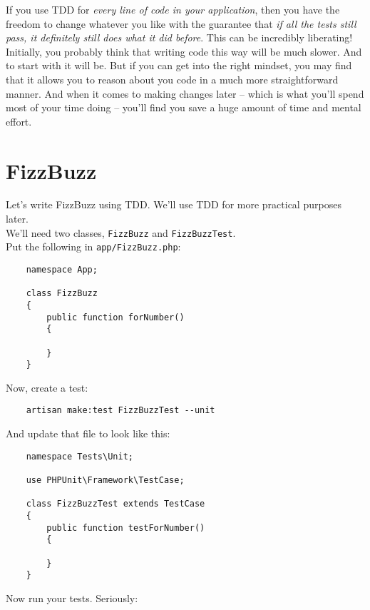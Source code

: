 If you use TDD for \textit{every line of code in your application}, then you have the freedom to change whatever you like with the guarantee that \textit{if all the tests still pass, it definitely still does what it did before}. This can be incredibly liberating!
\\

Initially, you probably think that writing code this way will be much slower. And to start with it will be. But if you can get into the right mindset, you may find that it allows you to reason about you code in a much more straightforward manner. And when it comes to making changes later – which is what you'll spend most of your time doing – you'll find you save a huge amount of time and mental effort.

\section{FizzBuzz}

Let's write FizzBuzz using TDD. We'll use TDD for more practical purposes later.
\\

We'll need two classes, \texttt{FizzBuzz} and \texttt{FizzBuzzTest}.
\\

Put the following in \texttt{app/FizzBuzz.php}:

\begin{verbatim}
    namespace App;

    class FizzBuzz
    {
        public function forNumber()
        {

        }
    }
\end{verbatim}

Now, create a test:

\begin{verbatim}
    artisan make:test FizzBuzzTest --unit
\end{verbatim}

And update that file to look like this:

\begin{verbatim}
    namespace Tests\Unit;

    use PHPUnit\Framework\TestCase;

    class FizzBuzzTest extends TestCase
    {
        public function testForNumber()
        {

        }
    }
\end{verbatim}

Now run your tests. Seriously:

